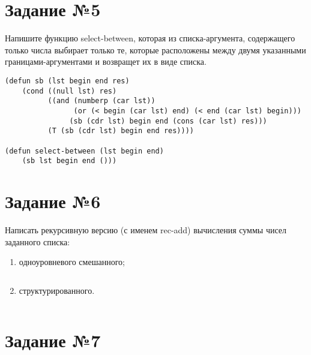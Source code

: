 \section{Задание №5}

Напишите функцию select-between, которая из списка-аргумента, содержащего только
числа выбирает только те, которые расположены между двумя указанными
границами-аргументами и возвращет их в виде списка.

\vspace{4mm}
\begin{minipage}{0.92\linewidth}
\begin{lstlisting}
(defun sb (lst begin end res)
    (cond ((null lst) res)
          ((and (numberp (car lst))
                (or (< begin (car lst) end) (< end (car lst) begin)))
               (sb (cdr lst) begin end (cons (car lst) res)))
          (T (sb (cdr lst) begin end res))))

(defun select-between (lst begin end)
    (sb lst begin end ()))
\end{lstlisting}
\end{minipage}

\section{Задание №6}

Написать рекурсивную версию (с именем rec-add) вычисления суммы чисел
заданного списка: 
\begin{enumerate}
    \item одноуровневого смешанного;

\vspace{4mm}
\begin{minipage}{0.92\linewidth}
\begin{lstlisting}
\end{lstlisting}
\end{minipage}

    \item структурированного.

\vspace{4mm}
\begin{minipage}{0.92\linewidth}
\begin{lstlisting}
\end{lstlisting}
\end{minipage}

\end{enumerate}

\section{Задание №7}

